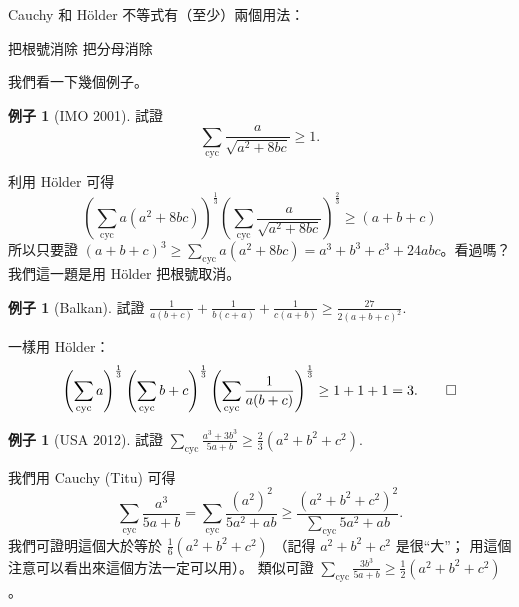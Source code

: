 \documentclass[11pt,nothm]{scrartcl}
\theoremstyle{definition}
\newtheorem{example}[theorem]{\color{blue!40!black}例子}
\let\oldendproof\endproof
\renewenvironment{proof}[1][【證】]{%
  \oldproof[\bfseries #1\nopunct]%
}{\oldendproof}
\begin{document}
Cauchy 和 H\"older 不等式有（至少）兩個用法：
\begin{enumerate}
  \ii 把根號消除
  \ii 把分母消除
\end{enumerate}

我們看一下幾個例子。
\begin{example}
  [IMO 2001] 試證 \[ \sum_{\text{cyc}} \frac{a}{\sqrt{a^2+8bc}} \ge 1. \]
\end{example}
\begin{proof}
  利用 H\"older 可得
  \[
    \left( \sum_{\text{cyc}} a(a^2+8bc) \right)^{\frac13}
    \left( \sum_{\text{cyc}} \frac{a}{\sqrt{a^2+8bc}} \right)^{\frac 23}
    \ge \left( a+b+c \right)
  \]
  所以只要證 $(a+b+c)^3 \ge \sum_{\text{cyc}} a(a^2+8bc) = a^3+b^3+c^3+24abc$。看過嗎？
\end{proof}
我們這一題是用 H\"older 把根號取消。


\begin{example}
  [Balkan] 試證 $\frac{1}{a(b+c)} + \frac{1}{b(c+a)} + \frac{1}{c(a+b)} \ge \frac{27}{2(a+b+c)^2}$.
\end{example}
\begin{proof}
  一樣用 H\"older：
  \[
    \left( \sum_{\text{cyc}} a \right)^{\frac 13}
    \left( \sum_{\text{cyc}} b+c \right)^{\frac 13}
    \left( \sum_{\text{cyc}} \frac{1}{a(b+c)} \right)^{\frac13}
    \ge 1+1+1
    = 3. \qedhere \]
\end{proof}


\begin{example}
  [USA 2012] 試證 $\sum_{\text{cyc}} \frac{a^3+3b^3}{5a+b} \ge \frac 23 \left( a^2+b^2+c^2 \right)$.
\end{example}
\begin{proof}
  我們用 Cauchy (Titu) 可得
  \[ \sum_{\text{cyc}} \frac{a^3}{5a+b}  = \sum_{\text{cyc}} \frac{(a^2)^2}{5a^2+ab} \ge \frac{(a^2+b^2+c^2)^2}{\sum_{\text{cyc}} 5a^2+ab}. \]
  我們可證明這個大於等於 $\frac16 (a^2+b^2+c^2)$
  （記得 $a^2+b^2+c^2$ 是很“大”；
  用這個注意可以看出來這個方法一定可以用）。
  類似可證 $\sum_{\text{cyc}} \frac{3b^3}{5a+b} \ge \frac 12 (a^2+b^2+c^2)$。
\end{proof}
\end{document}
